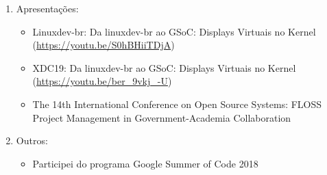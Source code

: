 \begin{enumerate}
  \item Apresentações:
    \begin{itemize}
      \item Linuxdev-br: Da linuxdev-br ao GSoC: Displays Virtuais no Kernel (\url{https://youtu.be/S0hBHiiTDjA})
      \item XDC19: Da linuxdev-br ao GSoC: Displays Virtuais no Kernel (\url{https://youtu.be/ber_9vkj_-U})
      \item The 14th International Conference on Open Source Systems: FLOSS Project Management in Government-Academia Collaboration
    \end{itemize}

  \item Outros:
    \begin{itemize}
      \item Participei do programa Google Summer of Code 2018
    \end{itemize}
\end{enumerate}
